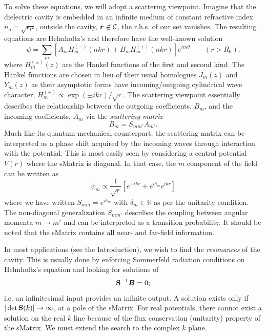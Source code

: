To solve these equations, we will adopt a scattering viewpoint. 
Imagine that the dielectric cavity is embedded in an infinite
medium of constant refractive index  $n_o=\sqrt{\epsilon\mu}$, 
outside the cavity, $\boldsymbol{r}\not\in{\mathcal{C}}$, 
the r.h.s. of our set vanishes. The resulting equations 
are Helmholtz's and therefore have the well-known solution
  \begin{equation}
    \label{eq:passive.formalism.hankelSolution}
    \psi = \sum_{m} \left[A_m H_m^{(-)}(nkr) + B_m H_m^{(+)}(nkr)\right]e^{im\theta} \qquad (r>R_0).
  \end{equation}
where $H_m^{(\pm)}(z)$ are the Hankel functions of the first
and second kind. The Hankel functions are chosen in lieu of their
usual homologues $J_m(z)$ and $Y_m(z)$ as their asymptotic forms 
have incoming/outgoing cylindrical wave character, 
$H_m^{(\pm)}\propto \exp(\pm ikr)/\sqrt{r}$. The scattering
viewpoint essentially describes the relationship between the 
outgoing coefficients, $B_m$, and the incoming coefficients, $A_m$
via the \textit{scattering matrix}
  \begin{equation}
    B_m = S_{mm'}A_{m'}. 
  \end{equation}
Much like its quantum-mechanical counterpart, the scattering
matrix can be interpreted as a phase shift acquired by the incoming
waves through interaction with the potential. This is most easily seen
by considering a central potential $V(r)$ where the \gls{sMatrix}
is diagonal. In that case, the $m$ component of the field can
be written as
  \begin{equation}
   \label{eq:passive.formalism.centralPotentialField}
   \psi_m \propto \frac{1}{\sqrt{r}}\left[e^{-ikr}+e^{i\delta_m}e^{ikr}\right]
  \end{equation}
where we have written $S_{mm}=e^{i\delta_m}$ with $\delta_m\in\mathbb{R}$ 
as per the unitarity condition. The non-diagonal
generalization $S_{mm'}$ describes the coupling between angular
momenta $m\rightarrow m'$ and can be interpreted as a transition
probability. 
It should be noted that the \gls{sMatrix} contains all near- and
far-field information. 

In most applications (see the Introduction), we wish to find the \textit{resonances} of the
cavity. This is usually done by enforcing Sommerfeld radiation conditions
on Helmholtz's equation and looking for solutions of
  \begin{equation}
   \mathbf{S}^{-1}\boldsymbol{B}=0;
  \end{equation}
i.e. an infinitesimal input provides an infinite output. 
A solution exists only if $|\det{\mathbf{S}(k)}|\rightarrow\infty$, 
at a pole of the \gls{sMatrix}. 
For real potentials, there cannot exist a solution on the real $k$ line because
of the flux conservation (unitarity) property of the \gls{sMatrix}. We 
must extend the search to the complex $k$ plane.

